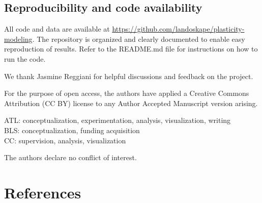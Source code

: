 \subsection*{Reproducibility and code availability}
All code and data are available at \url{https://github.com/landoskape/plasticity-modeling}. The repository is organized and clearly documented to enable easy reproduction of results. Refer to the README.md file for instructions on how to run the code.

\begin{acknowledgements}
We thank Jasmine Reggiani for helpful discussions and feedback on the project. 

For the purpose of open access, the authors have applied a Creative Commons Attribution (CC BY) license to any Author Accepted Manuscript version arising.
\end{acknowledgements}

\begin{contributions}
ATL: conceptualization, experimentation, analysis, visualization, writing \\
BLS: conceptualization, funding acquisition \\
CC: supervision, analysis, visualization \\
\end{contributions}

\begin{interests}
The authors declare no conflict of interest.
\end{interests}

\section*{References}

% 


